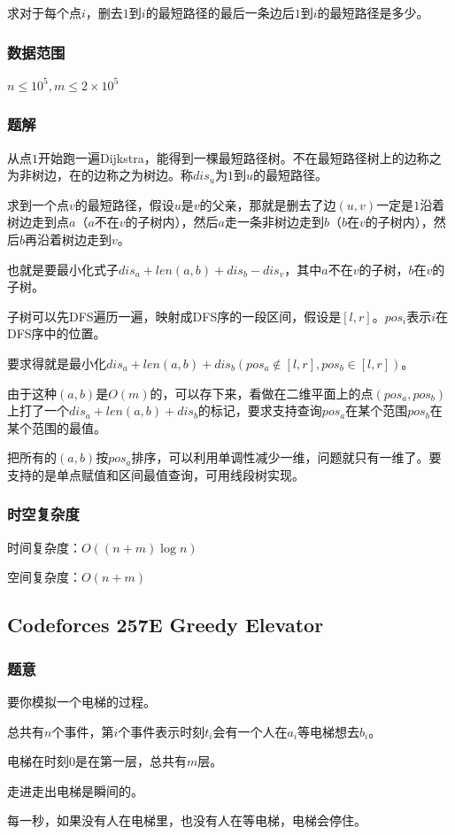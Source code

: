 \documentclass{ctexart}
\begin{document}
求对于每个点$i$，删去$1$到$i$的最短路径的最后一条边后$1$到$i$的最短路径是多少。
\subsubsection{数据范围}
$n \le 10^5,m \le 2 \times 10^5$
\subsubsection{题解}
从点$1$开始跑一遍Dijkstra，能得到一棵最短路径树。不在最短路径树上的边称之为非树边，在的边称之为树边。称$dis_u$为$1$到$u$的最短路径。

求到一个点$v$的最短路径，假设$u$是$v$的父亲，那就是删去了边$(u,v)$一定是$1$沿着树边走到点$a$（$a$不在$v$的子树内），然后$a$走一条非树边走到$b$（$b$在$v$的子树内），然后$b$再沿着树边走到$v$。

也就是要最小化式子$dis_a+len(a,b)+dis_b-dis_v$，其中$a$不在$v$的子树，$b$在$v$的子树。

子树可以先DFS遍历一遍，映射成DFS序的一段区间，假设是$[l,r]$。$pos_i$表示$i$在DFS序中的位置。

要求得就是最小化$dis_a+len(a,b)+dis_b(pos_a \not \in [l,r],pos_b \in [l,r])$。

由于这种$(a,b)$是$O(m)$的，可以存下来，看做在二维平面上的点$(pos_a,pos_b)$上打了一个$dis_a+len(a,b)+dis_b$的标记，要求支持查询$pos_a$在某个范围$pos_b$在某个范围的最值。

把所有的$(a,b)$按$pos_a$排序，可以利用单调性减少一维，问题就只有一维了。要支持的是单点赋值和区间最值查询，可用线段树实现。
\subsubsection{时空复杂度}
时间复杂度：$O((n+m) \log n)$

空间复杂度：$O(n+m)$
\subsection{Codeforces 257E Greedy Elevator}
\subsubsection{题意}
要你模拟一个电梯的过程。

总共有$n$个事件，第$i$个事件表示时刻$t_i$会有一个人在$a_i$等电梯想去$b_i$。

电梯在时刻$0$是在第一层，总共有$m$层。

走进走出电梯是瞬间的。

每一秒，如果没有人在电梯里，也没有人在等电梯，电梯会停住。
\end{document}

